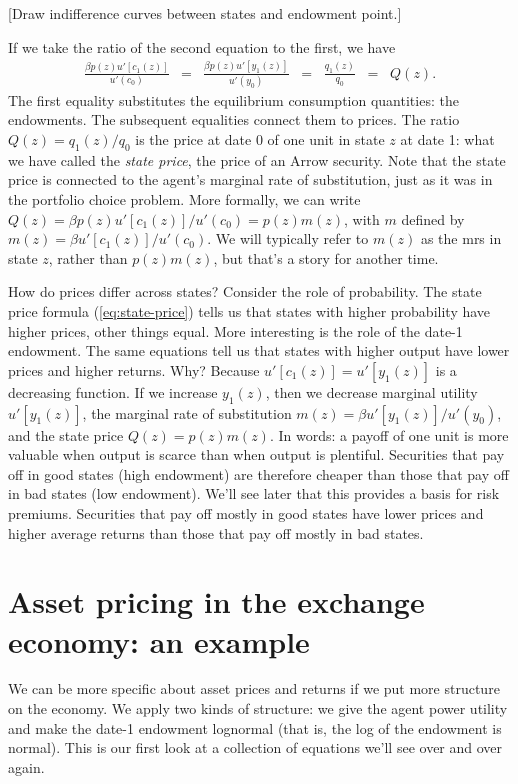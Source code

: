 \documentclass[11pt]{article}
\begin{document}
[Draw indifference curves between states and endowment point.]

If we take the ratio of the second equation to the first,
we have
\begin{eqnarray}
    \frac{\beta p(z) u'[c_1(z)]}{u'(c_0)} &=&
    \frac{\beta p(z) u'[y_1(z)]}{u'(y_0)}
    \;\;=\;\; \frac{q_1(z)}{q_0} \;\;=\;\; Q(z) .
    \label{eq:state-price}
\end{eqnarray}
The first equality substitutes the equilibrium consumption quantities:
the endowments.
The subsequent equalities connect them to prices.
The ratio $Q(z) = q_1(z)/q_0$ is the price at date 0 of one unit in state $z$ at date 1:
what we have called the {\it state price\/}, the price of an Arrow security.
Note that the state price is connected to the agent's marginal rate of substitution,
just as it was in the portfolio choice problem.
More formally, we can write
$ Q(z) = \beta p(z) u'[c_1(z)]/u'(c_0) = p(z) m(z) $,
with $m$ defined by $m(z) = \beta u'[c_1(z)]/u'(c_0)$.
We will typically refer to $m(z)$ as the mrs in state $z$,
rather than $p(z) m(z)$, but that's a story for another time.

How do prices differ across states?
Consider the role of probability.
The state price formula (\ref{eq:state-price})
tells us that states with higher probability have higher prices,
other things equal.
More interesting is the role of the date-1 endowment.
The same equations tell us that states with higher output have lower prices
and higher returns.
Why?  Because $u'[c_1(z)] = u'[y_1(z)]$ is a decreasing function.
If we increase $y_1(z)$, then we decrease marginal utility $u'[y_1(z)]$,
the marginal rate of substitution $m(z) = \beta u'[y_1(z)]/u'(y_0)$,
and the state price $Q(z) = p(z) m(z)$.
In words: a payoff of one unit is more valuable when output is scarce
than when output is plentiful.
Securities that pay off in good states (high endowment) are therefore
cheaper than those that pay off in bad states (low endowment).
We'll see later that this provides a basis for risk premiums.
Securities that pay off mostly in good states have lower prices
and higher average returns than those that pay off mostly in bad states.



\section{Asset pricing in the exchange economy: an example}

We can be more specific about asset prices and returns
if we put more structure on the economy.
We apply two kinds of structure:  we give the agent power utility
and make the date-1 endowment lognormal (that is, the log of the
endowment is normal).
This is our first look at a collection of equations we'll
see over and over again.
\end{document}
